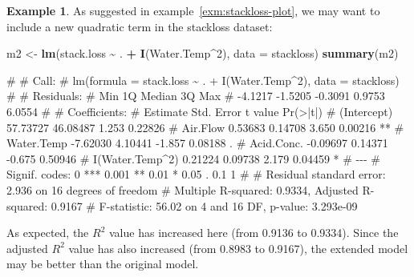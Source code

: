 \documentclass[
  a4paper,
]{article}
\newenvironment{Shaded}{\begin{snugshade}}{\end{snugshade}}
\newcommand{\AttributeTok}[1]{\textcolor[rgb]{0.13,0.29,0.53}{#1}}
\newcommand{\DecValTok}[1]{\textcolor[rgb]{0.00,0.00,0.81}{#1}}
\newcommand{\FunctionTok}[1]{\textcolor[rgb]{0.13,0.29,0.53}{\textbf{#1}}}
\newcommand{\NormalTok}[1]{#1}
\newcommand{\OtherTok}[1]{\textcolor[rgb]{0.56,0.35,0.01}{#1}}
\newcommand{\SpecialCharTok}[1]{\textcolor[rgb]{0.81,0.36,0.00}{\textbf{#1}}}
\theoremstyle{definition}
\theoremstyle{definition}
\newtheorem{example}{Example}[section]
\theoremstyle{definition}
\theoremstyle{definition}
\theoremstyle{remark}
\begin{document}
\begin{example}
As suggested in example~\ref{exm:stackloss-plot}, we may want to
include a new quadratic term in the stackloss dataset:

\begin{Shaded}
\begin{Highlighting}[]
\NormalTok{m2 }\OtherTok{\textless{}{-}} \FunctionTok{lm}\NormalTok{(stack.loss }\SpecialCharTok{\textasciitilde{}}\NormalTok{ . }\SpecialCharTok{+} \FunctionTok{I}\NormalTok{(Water.Temp}\SpecialCharTok{\^{}}\DecValTok{2}\NormalTok{), }\AttributeTok{data =}\NormalTok{ stackloss)}
\FunctionTok{summary}\NormalTok{(m2)}
\end{Highlighting}
\end{Shaded}

\begin{Shaded}
\begin{Highlighting}[]
\NormalTok{\# }
\NormalTok{\# Call:}
\NormalTok{\# lm(formula = stack.loss \textasciitilde{} . + I(Water.Temp\^{}2), data = stackloss)}
\NormalTok{\# }
\NormalTok{\# Residuals:}
\NormalTok{\#     Min      1Q  Median      3Q     Max }
\NormalTok{\# {-}4.1217 {-}1.5205 {-}0.3091  0.9753  6.0554 }
\NormalTok{\# }
\NormalTok{\# Coefficients:}
\NormalTok{\#                 Estimate Std. Error t value Pr(\textgreater{}|t|)   }
\NormalTok{\# (Intercept)     57.73727   46.08487   1.253  0.22826   }
\NormalTok{\# Air.Flow         0.53683    0.14708   3.650  0.00216 **}
\NormalTok{\# Water.Temp      {-}7.62030    4.10441  {-}1.857  0.08188 . }
\NormalTok{\# Acid.Conc.      {-}0.09697    0.14371  {-}0.675  0.50946   }
\NormalTok{\# I(Water.Temp\^{}2)  0.21224    0.09738   2.179  0.04459 * }
\NormalTok{\# {-}{-}{-}}
\NormalTok{\# Signif. codes:  0 \textquotesingle{}***\textquotesingle{} 0.001 \textquotesingle{}**\textquotesingle{} 0.01 \textquotesingle{}*\textquotesingle{} 0.05 \textquotesingle{}.\textquotesingle{} 0.1 \textquotesingle{} \textquotesingle{} 1}
\NormalTok{\# }
\NormalTok{\# Residual standard error: 2.936 on 16 degrees of freedom}
\NormalTok{\# Multiple R{-}squared:  0.9334,  Adjusted R{-}squared:  0.9167 }
\NormalTok{\# F{-}statistic: 56.02 on 4 and 16 DF,  p{-}value: 3.293e{-}09}
\end{Highlighting}
\end{Shaded}

As expected, the \(R^2\) value has increased here (from 0.9136 to 0.9334).
Since the adjusted \(R^2\) value has also increased (from 0.8983 to 0.9167),
the extended model may be better than the original model.
\end{example}
\end{document}
